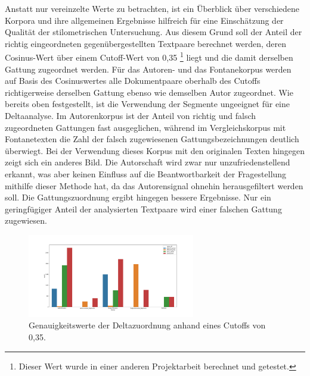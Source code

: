 \documentclass[a4paper,10p]{article}
\begin{document}
Anstatt nur vereinzelte Werte zu betrachten, ist ein Überblick über verschiedene Korpora und ihre allgemeinen Ergebnisse hilfreich für eine Einschätzung der Qualität der stilometrischen Untersuchung. Aus diesem Grund soll der Anteil der richtig eingeordneten gegenübergestellten Textpaare berechnet werden, deren Cosinus-Wert über einem Cutoff-Wert von 0,35 \footnote{Dieser Wert wurde in einer anderen Projektarbeit berechnet und getestet.} liegt und die damit derselben Gattung zugeordnet werden. Für das Autoren- und das Fontanekorpus werden auf Basis des Cosinuswertes alle Dokumentpaare oberhalb des Cutoffs richtigerweise derselben Gattung ebenso wie demselben Autor zugeordnet. Wie bereits oben festgestellt, ist die Verwendung der Segmente ungeeignet für eine Deltaanalyse. Im Autorenkorpus ist der Anteil von richtig und falsch zugeordneten Gattungen fast ausgeglichen, während im Vergleichskorpus mit Fontanetexten die Zahl der falsch zugewiesenen Gattungsbezeichnungen deutlich überwiegt. Bei der Verwendung dieses Korpus mit den originalen Texten hingegen zeigt sich ein anderes Bild. Die Autorschaft wird zwar nur unzufriedenstellend erkannt, was aber keinen Einfluss auf die Beantwortbarkeit der Fragestellung mithilfe dieser Methode hat, da das Autorensignal ohnehin herausgefiltert werden soll. Die Gattungszuordnung ergibt hingegen bessere Ergebnisse. Nur ein geringfügiger Anteil der analysierten Textpaare wird einer falschen Gattung zugewiesen. \par 

\begin{figure}
	\includegraphics[width=0.65\textwidth]{cutoffs_all.png}
	\caption{Genauigkeitswerte der Deltazuordnung anhand eines Cutoffs von 0,35.}
	\label{fig:deltacutoff}
\end{figure}
\end{document}

